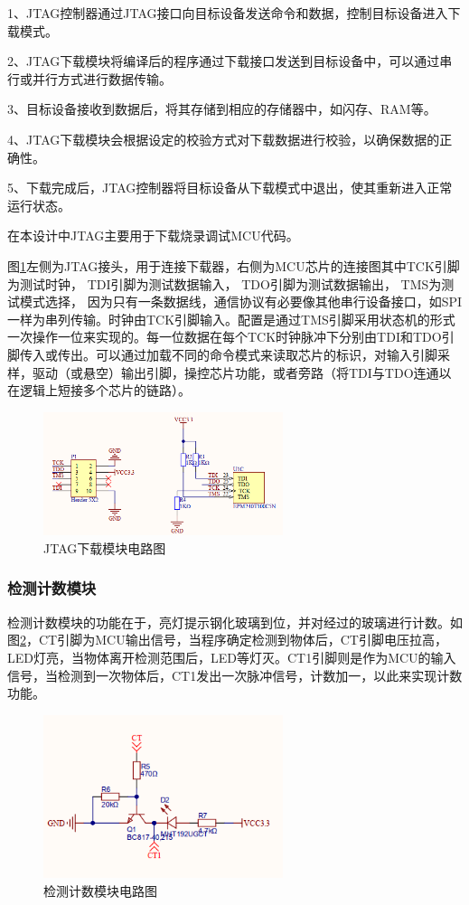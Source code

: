 1、JTAG控制器通过JTAG接口向目标设备发送命令和数据，控制目标设备进入下载模式。

2、JTAG下载模块将编译后的程序通过下载接口发送到目标设备中，可以通过串行或并行方式进行数据传输。

3、目标设备接收到数据后，将其存储到相应的存储器中，如闪存、RAM等。

4、JTAG下载模块会根据设定的校验方式对下载数据进行校验，以确保数据的正确性。

5、下载完成后，JTAG控制器将目标设备从下载模式中退出，使其重新进入正常运行状态。

在本设计中JTAG主要用于下载烧录调试MCU代码。

    图\ref{JTAG下载模块电路图}左侧为JTAG接头，用于连接下载器，右侧为MCU芯片的连接图其中TCK引脚为测试时钟，
    TDI引脚为测试数据输入，
TDO引脚为测试数据输出，
TMS为测试模式选择，
因为只有一条数据线，通信协议有必要像其他串行设备接口，如SPI一样为串列传输。时钟由TCK引脚输入。配置是通过TMS引脚采用状态机的形式一次操作一位来实现的。每一位数据在每个TCK时钟脉冲下分别由TDI和TDO引脚传入或传出。可以通过加载不同的命令模式来读取芯片的标识，对输入引脚采样，驱动（或悬空）输出引脚，操控芯片功能，或者旁路（将TDI与TDO连通以在逻辑上短接多个芯片的链路）。
    \begin{figure}[ht]
        \centering
        \includegraphics[width=7cm]{figure/JTAG download circuit.png}
        \caption{JTAG下载模块电路图}
        \label{JTAG下载模块电路图}
    \end{figure}
    
    \subsubsection{检测计数模块}
    检测计数模块的功能在于，亮灯提示钢化玻璃到位，并对经过的玻璃进行计数。如图\ref{检测计数模块电路图}，CT引脚为MCU输出信号，当程序确定检测到物体后，CT引脚电压拉高，LED灯亮，当物体离开检测范围后，LED等灯灭。CT1引脚则是作为MCU的输入信号，当检测到一次物体后，CT1发出一次脉冲信号，计数加一，以此来实现计数功能。
    \begin{figure}[ht]
        \centering
        \includegraphics[width=7cm]{figure/detection count circuit.png}
        \caption{检测计数模块电路图}
        \label{检测计数模块电路图}
    \end{figure}
    
